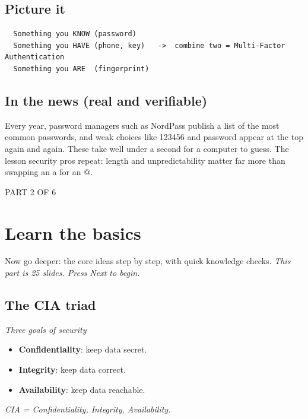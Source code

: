 \documentclass[12pt,openany]{book}
\begin{document}
\medskip

\subsection*{Picture it}


\begin{lstlisting}
  Something you KNOW (password)
  Something you HAVE (phone, key)   ->  combine two = Multi-Factor Authentication
  Something you ARE  (fingerprint)
\end{lstlisting}

\medskip

\subsection*{In the news (real and verifiable)}


Every year, password managers such as NordPass publish a list of the most common passwords, and weak choices like 123456 and password appear at the top again and again. These take well under a second for a computer to guess. The lesson security pros repeat: length and unpredictability matter far more than swapping an a for an @.

\medskip

\vspace{4pt}\noindent\textsc{PART 2 OF 6}


\section*{Learn the basics}

Now go deeper: the core ideas step by step, with quick knowledge checks.
{\small\itshape\color{gray}This part is 25 slides. Press Next to begin.}

\medskip

\subsection*{The CIA triad}
{\small\itshape\color{gray}Three goals of security}


\begin{itemize}
  \item \textbf{Confidentiality}: keep data secret.
  \item \textbf{Integrity}: keep data correct.
  \item \textbf{Availability}: keep data reachable.
\end{itemize}
{\small\itshape\color{gray}CIA = Confidentiality, Integrity, Availability.}
\end{document}
